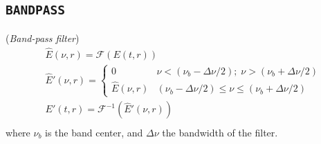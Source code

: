 \documentclass{report}
\begin{document}
\subsection*{\texttt{BANDPASS}}
(\textit{Band-pass filter})
\begin{equation}
\begin{aligned}
&\widehat{E}(\nu,r) = \mathcal{F}(E(t,r))\\
&\widehat{E}'(\nu,r) = \left\{ \begin{array}{ll}
  0                      & \nu<(\nu_b-\Delta\nu/2); \; \nu>(\nu_b+\Delta\nu/2)\\
  \widehat{E}(\nu,r) & (\nu_b-\Delta\nu/2) \leq \nu \leq (\nu_b+\Delta\nu/2)\end{array}\right.\\ 
&E'(t,r) = \mathcal{F}^{-1}(\widehat{E}'(\nu,r))\\
\end{aligned}
\end{equation}
where $\nu_b$ is the band center, and $\Delta\nu$ the bandwidth of the filter.
\end{document}
